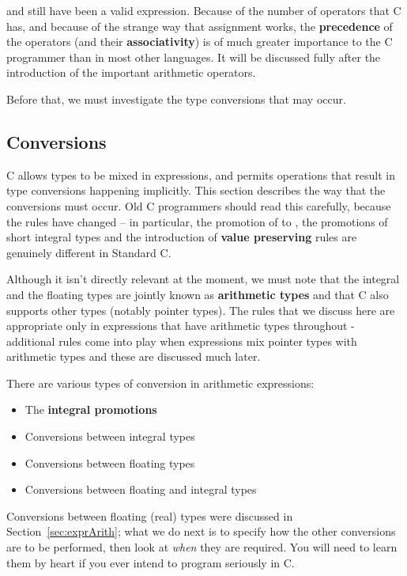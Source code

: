   and still have been a valid expression. Because of the number of
   operators that C has, and because of the strange way that assignment works,
   the \textbf{precedence} of the operators (and their
   \textbf{associativity}) is of much greater importance to the
   C programmer than in most other languages. It will be discussed fully
   after the introduction of the important arithmetic operators.


  Before that, we must investigate the type conversions that may occur.


  \subsection{Conversions}
   

   C allows types to be mixed in expressions, and permits operations that
    result in type conversions happening implicitly. This section describes
    the way that the conversions must occur. Old C programmers should read
    this carefully, because the rules have changed -- in particular, the
    promotion of \float{} to \double, the promotions of
    short integral types and the introduction of \textbf{value preserving}
    rules are genuinely different in Standard C.


   Although it isn't directly relevant at the moment, we must note that the
    integral and the floating types are jointly known as \textbf{arithmetic
    types} and that C also supports other types (notably pointer types).
    The rules that we discuss here are appropriate only in expressions that
    have arithmetic types throughout - additional rules come into play when
    expressions mix pointer types with arithmetic types and these are
    discussed much later.


   There are various types of conversion in arithmetic expressions:


   \begin{itemize}
    \item The \textbf{integral promotions}
    \item Conversions between integral types
    \item Conversions between floating types
    \item Conversions between floating and integral types
   \end{itemize}

   Conversions between floating (real) types
   were discussed in Section~\ref{sec:exprArith};
   what we do next is to specify how the other conversions are
    to be performed, then look at \textit{when} they are required. You will
    need to learn them by heart if you ever intend to program seriously
    in C.


